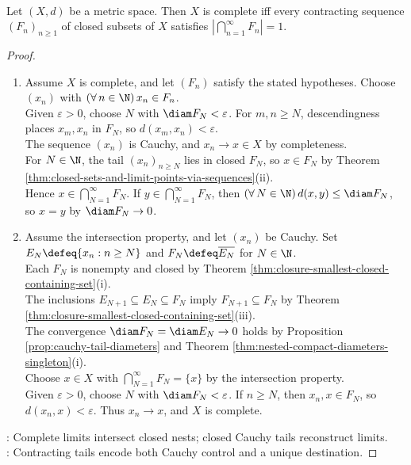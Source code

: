 \begin{theorem} \label{thm:cantor-intersection-complete-metric-space} \\
Let $(X,d)$ be a metric space. Then $X$ is complete iff every contracting sequence $(F_n)_{n\geq1}$ of closed subsets of $X$ satisfies $\left|\bigcap\limits_{n=1}^{\infty}F_n\right|=1$.
\begin{proof}
\begin{enumerate}[label=\roman*.]
\setlength{\itemsep}{0pt}
\item[$(\Rightarrow)$] Assume $X$ is complete, and let $(F_n)$ satisfy the stated hypotheses. Choose $(x_n)$ with $(\forall\,n\in\N)\,x_n\in F_n$.\\
Given $\varepsilon>0$, choose $N$ with $\diam F_N<\varepsilon$. For $m,n\geq N$, descendingness places $x_m,x_n$ in $F_N$, so $d(x_m,x_n)<\varepsilon$.\\
The sequence $(x_n)$ is Cauchy, and $x_n\to x\in X$ by completeness.\\
For $N\in\N$, the tail $(x_n)_{n\geq N}$ lies in closed $F_N$, so $x\in F_N$ by Theorem \ref{thm:closed-sets-and-limit-points-via-sequences}(ii).\\
Hence $x\in\bigcap\limits_{N=1}^{\infty}F_N$. If $y\in\bigcap\limits_{N=1}^{\infty}F_N$, then $(\forall\,N\in\N)\,d(x,y)\leq\diam F_N$, so $x=y$ by $\diam F_N\to0$.
\item[$(\Leftarrow)$] Assume the intersection property, and let $(x_n)$ be Cauchy. Set $E_N\defeq\{x_n:n\geq N\}$ and $F_N\defeq\overline{E_N}$ for $N\in\N$.\\
Each $F_N$ is nonempty and closed by Theorem \ref{thm:closure-smallest-closed-containing-set}(i).\\
The inclusions $E_{N+1}\subseteq E_N\subseteq F_N$ imply $F_{N+1}\subseteq F_N$ by Theorem \ref{thm:closure-smallest-closed-containing-set}(iii).\\
The convergence $\diam F_N=\diam E_N\to0$ holds by Proposition \ref{prop:cauchy-tail-diameters} and Theorem \ref{thm:nested-compact-diameters-singleton}(i).\\
Choose $x\in X$ with $\bigcap\limits_{N=1}^{\infty}F_N=\{x\}$ by the intersection property.\\
Given $\varepsilon>0$, choose $N$ with $\diam F_N<\varepsilon$. If $n\geq N$, then $x_n,x\in F_N$, so $d(x_n,x)<\varepsilon$. Thus $x_n\to x$, and $X$ is complete.
\end{enumerate}
: Complete limits intersect closed nests; closed Cauchy tails reconstruct limits.\\
: Contracting tails encode both Cauchy control and a unique destination.
\end{proof}
\end{theorem}

